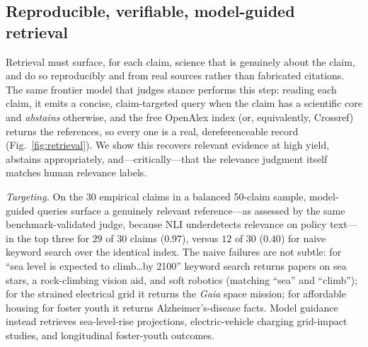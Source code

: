 \subsection{Reproducible, verifiable, model-guided retrieval}
\label{sec:res-retrieval}
Retrieval must surface, for each claim, science that is genuinely about the claim, and do so reproducibly
and from real sources rather than fabricated citations. The same frontier model that judges stance performs
this step: reading each claim, it emits a concise, claim-targeted query when the claim has a scientific core
and \emph{abstains} otherwise, and the free OpenAlex index (or, equivalently, Crossref) returns the
references, so every one is a real, dereferenceable record (Fig.~\ref{fig:retrieval}). We show this recovers
relevant evidence at high yield, abstains appropriately, and---critically---that the relevance judgment
itself matches human relevance labels.

\emph{Targeting.} On the 30 empirical claims in a balanced 50-claim sample, model-guided queries surface a
genuinely relevant reference---as assessed by the same benchmark-validated judge, because NLI underdetects
relevance on policy text---in the top three for $29$ of $30$ claims ($0.97$), versus $12$ of $30$ ($0.40$)
for naive keyword search over the identical index. The naive failures are not subtle: for ``sea level is
expected to climb\ldots by 2100'' keyword search returns papers on sea stars, a rock-climbing vision aid,
and soft robotics (matching ``sea'' and ``climb''); for the strained electrical grid it returns the
\emph{Gaia} space mission; for affordable housing for foster youth it returns Alzheimer's-disease facts.
Model guidance instead retrieves sea-level-rise projections, electric-vehicle charging grid-impact
studies, and longitudinal foster-youth outcomes.

